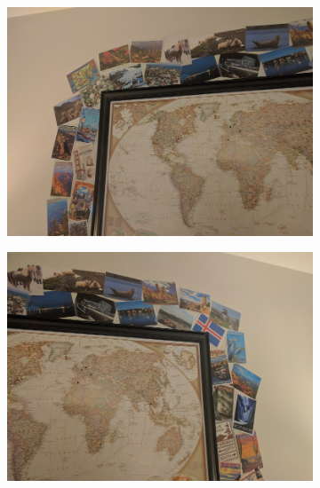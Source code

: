 \documentclass[12pt]{article}
\begin{document}
\begin{figure}[t!]
    \begin{subfigure}[t]{0.22\textwidth}
        \centering
        \includegraphics[width=\linewidth]{../Images/CustomSet1/1}
    \end{subfigure}
    \begin{subfigure}[t]{0.22\textwidth}
        \centering
        \includegraphics[width=\linewidth]{../Images/CustomSet1/2}
    \end{subfigure}
    \begin{subfigure}[t]{0.22\textwidth}
        \centering

\end{subfigure}
\end{figure}
\end{document}
